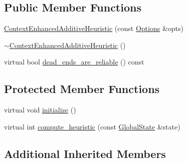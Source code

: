 \subsection*{Public Member Functions}
\begin{DoxyCompactItemize}
\item 
\hyperlink{classcea__heuristic_1_1ContextEnhancedAdditiveHeuristic_ac062acf8a0b3a904752420bdd02be18b}{Context\-Enhanced\-Additive\-Heuristic} (const \hyperlink{classOptions}{Options} \&opts)
\item 
\hyperlink{classcea__heuristic_1_1ContextEnhancedAdditiveHeuristic_a9e6acd10125851efb6f9e9ae6b9be342}{$\sim$\-Context\-Enhanced\-Additive\-Heuristic} ()
\item 
virtual bool \hyperlink{classcea__heuristic_1_1ContextEnhancedAdditiveHeuristic_a084c0b970b564a8985a9fa8b547de1c8}{dead\-\_\-ends\-\_\-are\-\_\-reliable} () const 
\end{DoxyCompactItemize}
\subsection*{Protected Member Functions}
\begin{DoxyCompactItemize}
\item 
virtual void \hyperlink{classcea__heuristic_1_1ContextEnhancedAdditiveHeuristic_a2c354c358f314bb32ec020f0d9c8bcac}{initialize} ()
\item 
virtual int \hyperlink{classcea__heuristic_1_1ContextEnhancedAdditiveHeuristic_a6071c4aa48d00eb35fdae3f4ed611470}{compute\-\_\-heuristic} (const \hyperlink{classGlobalState}{Global\-State} \&state)
\end{DoxyCompactItemize}
\subsection*{Additional Inherited Members}



